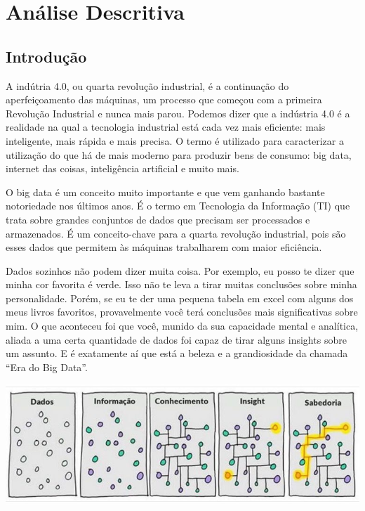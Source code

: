\documentclass[
]{book}
\begin{document}
\hypertarget{analise_descritiva}{%
\chapter{Análise Descritiva}\label{analise_descritiva}}

\hypertarget{introduuxe7uxe3o}{%
\section{Introdução}\label{introduuxe7uxe3o}}

A indútria 4.0, ou quarta revolução industrial, é a continuação do aperfeiçoamento das máquinas, um processo que começou com a primeira Revolução Industrial e nunca mais parou. Podemos dizer que a indústria 4.0 é a realidade na qual a tecnologia industrial está cada vez mais eficiente: mais inteligente, mais rápida e mais precisa. O termo é utilizado para caracterizar a utilização do que há de mais moderno para produzir bens de consumo: big data, internet das coisas, inteligência artificial e muito mais.

O big data é um conceito muito importante e que vem ganhando bastante notoriedade nos últimos anos. É o termo em Tecnologia da Informação (TI) que trata sobre grandes conjuntos de dados que precisam ser processados e armazenados. É um conceito-chave para a quarta revolução industrial, pois são esses dados que permitem às máquinas trabalharem com maior eficiência.

Dados sozinhos não podem dizer muita coisa. Por exemplo, eu posso te dizer que minha cor favorita é verde. Isso não te leva a tirar muitas conclusões sobre minha personalidade. Porém, se eu te der uma pequena tabela em excel com alguns dos meus livros favoritos, provavelmente você terá conclusões mais significativas sobre mim. O que aconteceu foi que você, munido da sua capacidade mental e analítica, aliada a uma certa quantidade de dados foi capaz de tirar alguns insights sobre um assunto. E é exatamente aí que está a beleza e a grandiosidade da chamada ``Era do Big Data''.

\includegraphics{dados_sabedoria.jpg}
\end{document}
